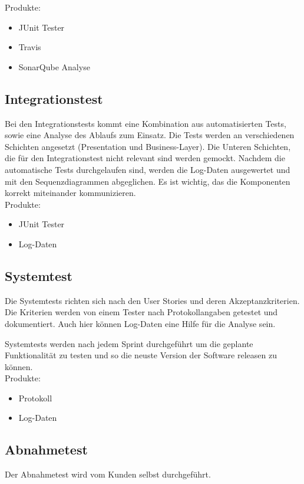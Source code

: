 \documentclass[11pt]{scrartcl}
\begin{document}
Produkte:
\begin{itemize}
\item JUnit Tester
\item Travis
\item SonarQube Analyse
\end{itemize}

\subsection{Integrationstest}
Bei den Integrationstests kommt eine Kombination aus automatisierten Tests, 
sowie eine Analyse des Ablaufs zum Einsatz.
Die Tests werden an verschiedenen Schichten angesetzt (Presentation und Business-Layer). 
Die Unteren Schichten, die für den Integrationstest nicht relevant sind werden gemockt. 
Nachdem die automatische Tests durchgelaufen sind, werden die Log-Daten ausgewertet und mit den 
Sequenzdiagrammen abgeglichen. Es ist wichtig, das die Komponenten korrekt miteinander kommunizieren.\\

Produkte:
\begin{itemize}
\item JUnit Tester
\item Log-Daten
\end{itemize}

\subsection{Systemtest}
Die Systemtests richten sich nach den User Stories und deren Akzeptanzkriterien. 
Die Kriterien werden von einem Tester nach 
Protokollangaben getestet und dokumentiert. Auch hier können Log-Daten eine Hilfe für die Analyse sein.

Systemtests werden nach jedem Sprint durchgeführt um die geplante Funktionalität 
zu testen und so die neuste Version der Software releasen zu können.\\

Produkte:
\begin{itemize}
\item Protokoll
\item Log-Daten
\end{itemize}

\subsection{Abnahmetest}
Der Abnahmetest wird vom Kunden selbst durchgeführt.
\end{document}

